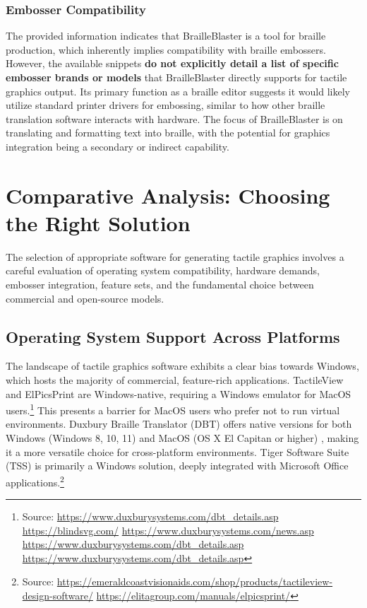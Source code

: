 \subsubsection{Embosser Compatibility}

The provided information indicates that BrailleBlaster is a tool for braille production, which inherently implies compatibility with braille embossers. However, the available snippets \textbf{do not explicitly detail a list of specific embosser brands or models} that BrailleBlaster directly supports for tactile graphics output. Its primary function as a braille editor suggests it would likely utilize standard printer drivers for embossing, similar to how other braille translation software interacts with hardware. The focus of BrailleBlaster is on translating and formatting text into braille, with the potential for graphics integration being a secondary or indirect capability.

\section{Comparative Analysis: Choosing the Right Solution}\label{sec:comparative-analysis}

The selection of appropriate software for generating tactile graphics involves a careful evaluation of operating system compatibility, hardware demands, embosser integration, feature sets, and the fundamental choice between commercial and open-source models.

\subsection{Operating System Support Across Platforms}

The landscape of tactile graphics software exhibits a clear bias towards Windows, which hosts the majority of commercial, feature-rich applications. TactileView and ElPicsPrint are Windows-native, requiring a Windows emulator for MacOS users.\footnote{Source:  \url{https://www.duxburysystems.com/dbt_details.asp} \url{https://blindsvg.com/} \url{https://www.duxburysystems.com/news.asp} \url{https://www.duxburysystems.com/dbt_details.asp} \url{https://www.duxburysystems.com/dbt_details.asp}} This presents a barrier for MacOS users who prefer not to run virtual environments. Duxbury Braille Translator (DBT) offers native versions for both Windows (Windows 8, 10, 11) and MacOS (OS X El Capitan or higher) \cite{[22, 21, }, making it a more versatile choice for cross-platform environments. Tiger Software Suite (TSS) is primarily a Windows solution, deeply integrated with Microsoft Office applications.\footnote{Source:  \url{https://emeraldcoastvisionaids.com/shop/products/tactileview-design-software/} \url{https://elitagroup.com/manuals/elpicsprint/}}

